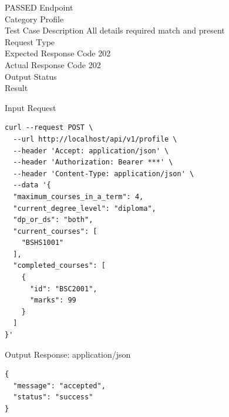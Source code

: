 \begin{testcase}{18}{PASSED}
Endpoint \hfill {}\\
Category \hfill Profile\\
Test Case Description \hfill All details required match and present\\

Request Type    \hfill {}\\
Expected Response Code    \hfill 202\\
Actual Response Code    \hfill 202\\

Output Status \hfill {}\\
Result \hfill {}

\begin{ipblock}{Input Request}
\begin{verbatim}
curl --request POST \
  --url http://localhost/api/v1/profile \
  --header 'Accept: application/json' \
  --header 'Authorization: Bearer ***' \
  --header 'Content-Type: application/json' \
  --data '{
  "maximum_courses_in_a_term": 4,
  "current_degree_level": "diploma",
  "dp_or_ds": "both",
  "current_courses": [
    "BSHS1001"
  ],
  "completed_courses": [
    {
      "id": "BSC2001",
      "marks": 99
    }
  ]
}'
\end{verbatim}
\end{ipblock}

\begin{opblock}{Output Response: application/json}
\begin{verbatim}
{
  "message": "accepted",
  "status": "success"
}
\end{verbatim}
\end{opblock}
\end{testcase}

